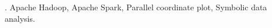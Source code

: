 \documentclass[12pt]{article}
\begin{document}
.
Apache Hadoop, Apache Spark, Parallel coordinate plot, Symbolic data analysis.


%
%
%
\end{document}

